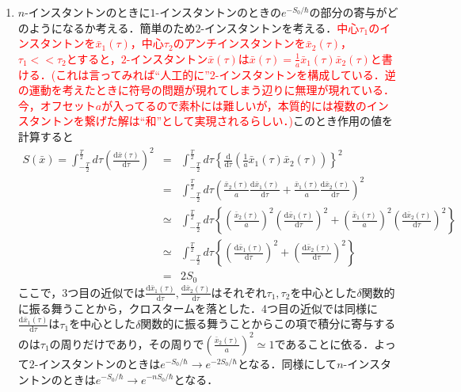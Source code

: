 \documentclass[a4paper,11pt]{jsarticle}
\begin{document}
\begin{enumerate}
\renewcommand{\labelenumi}{(\arabic{enumi})}
\item $n$-インスタントンのときに$1$-インスタントンのときの$e^{-S_0/\hbar}$の部分の寄与がどのようになるか考える．簡単のため$2$-インスタントンを考える．\textcolor{red}{中心$\tau_1$のインスタントンを$\bar{x}_1(\tau)$，中心$\tau_2$のアンチインスタントンを$\bar{x}_2(\tau)$，$\tau_1<<\tau_2$とすると，$2$-インスタントン$\bar{x}(\tau)$は$\bar{x}(\tau)=\frac{1}{a}\bar{x}_1(\tau)\bar{x}_2(\tau)$と書ける．}\textcolor{red}{(これは言ってみれば``人工的に''2-インスタントンを構成している．逆の運動を考えたときに符号の問題が現れてしまう辺りに無理が現れている．今，オフセット$a$が入ってるので素朴には難しいが，本質的には複数のインスタントンを繋げた解は``和''として実現されるらしい．)}このとき作用の値を計算すると
\begin{eqnarray*}
S(\bar{x})=\int_{-\frac{T}{2}}^{\frac{T}{2}}d\tau\left(\frac{\mathrm{d}\bar{x}(\tau)}{\mathrm{d}\tau}\right)^2&=&\int_{-\frac{T}{2}}^{\frac{T}{2}}d\tau\left\{\frac{\mathrm{d}}{\mathrm{d}\tau}\left(\frac{1}{a}\bar{x}_1(\tau)\bar{x}_2(\tau)\right)\right\}^2 \\
&=&\int_{-\frac{T}{2}}^{\frac{T}{2}}d\tau\left(\frac{\bar{x}_2(\tau)}{a}\frac{\mathrm{d}\bar{x}_1(\tau)}{\mathrm{d}\tau}+\frac{\bar{x}_1(\tau)}{a}\frac{\mathrm{d}\bar{x}_2(\tau)}{\mathrm{d}\tau}\right)^2 \\
&\simeq&\int_{-\frac{T}{2}}^{\frac{T}{2}}d\tau\left\{\left(\frac{\bar{x}_2(\tau)}{a}\right)^2\left(\frac{\mathrm{d}\bar{x}_1(\tau)}{\mathrm{d}\tau}\right)^2+\left(\frac{\bar{x}_1(\tau)}{a}\right)^2\left(\frac{\mathrm{d}\bar{x}_2(\tau)}{\mathrm{d}\tau}\right)^2\right\} \\
&\simeq&\int_{-\frac{T}{2}}^{\frac{T}{2}}d\tau\left\{\left(\frac{\mathrm{d}\bar{x}_1(\tau)}{\mathrm{d}\tau}\right)^2+\left(\frac{\mathrm{d}\bar{x}_2(\tau)}{\mathrm{d}\tau}\right)^2\right\} \\
&=&2S_0
\end{eqnarray*}
ここで，3つ目の近似では$\frac{\mathrm{d}\bar{x}_1(\tau)}{\mathrm{d}\tau},\frac{\mathrm{d}\bar{x}_2(\tau)}{\mathrm{d}\tau}$はそれぞれ$\tau_1,\tau_2$を中心とした$\delta$関数的に振る舞うことから，クロスタームを落とした．4つ目の近似では同様に$\frac{\mathrm{d}\bar{x}_1(\tau)}{\mathrm{d}\tau}$は$\tau_1$を中心とした$\delta$関数的に振る舞うことからこの項で積分に寄与するのは$\tau_1$の周りだけであり，その周りで$\left(\frac{\bar{x}_2(\tau)}{a}\right)^2\simeq 1$であることに依る．よって$2$-インスタントンのときは$e^{-S_0/\hbar}\rightarrow e^{-2S_0/\hbar}$となる．同様にして$n$-インスタントンのときは$e^{-S_0/\hbar}\rightarrow e^{-nS_0/\hbar}$となる．

\end{enumerate}
\end{document}
